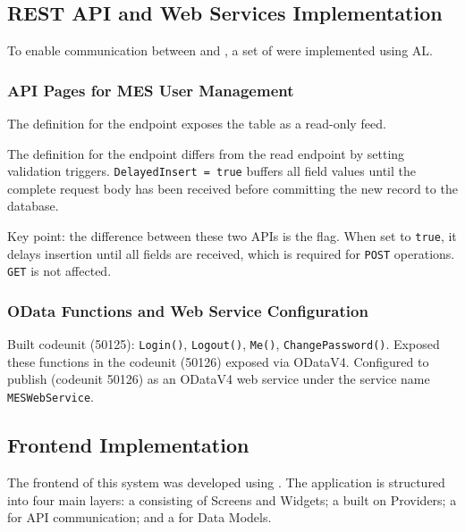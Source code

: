 \subsection{REST API and Web Services Implementation}

To enable communication between  and
, a set of 
were implemented using AL.

\subsubsection{API Pages for MES User Management}

The  definition for the  endpoint
exposes the  table as a read-only  feed.

The  definition for the 
endpoint differs from the read endpoint by setting validation triggers.
\texttt{DelayedInsert\,=\,true} buffers all field values until the
complete request body has been received before committing the new
 record to the database.

Key point: the difference between these two APIs is the  flag.
When set to \texttt{true}, it delays insertion until all fields are received,
which is required for \texttt{POST} operations. \texttt{GET} is not affected.

\subsubsection{OData Functions and Web Service Configuration}

Built  codeunit (50125): \texttt{Login()}, \texttt{Logout()}, \texttt{Me()}, \texttt{ChangePassword()}.
Exposed these functions in the  codeunit (50126) exposed via ODataV4.
Configured  to publish 
(codeunit 50126) as an ODataV4 web service under the service name
\texttt{MESWebService}.

\subsection{Frontend Implementation}

The frontend of this system was developed using . The
application is structured into four main layers: a \textbf{}
consisting of Screens and Widgets; a \textbf{}
built on Providers; a \textbf{} for API communication;
and a \textbf{} for Data Models.

